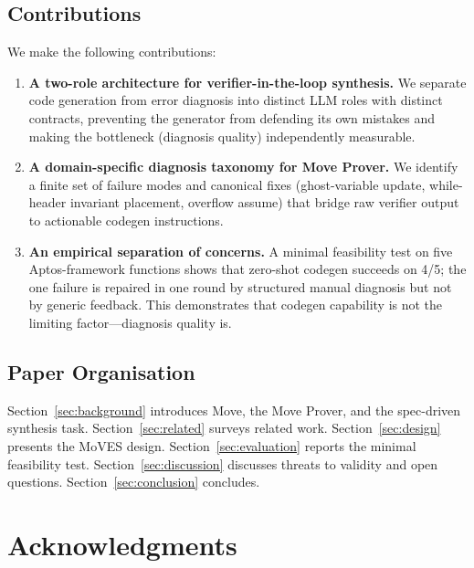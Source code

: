 \documentclass[conference]{IEEEtran}
\begin{document}
\subsection{Contributions}\label{sec:contributions}

We make the following contributions:

\begin{enumerate}
\item \textbf{A two-role architecture for verifier-in-the-loop synthesis.} We separate code generation from error diagnosis into distinct LLM roles with distinct contracts, preventing the generator from defending its own mistakes and making the bottleneck (diagnosis quality) independently measurable.
\item \textbf{A domain-specific diagnosis taxonomy for Move Prover.} We identify a finite set of failure modes and canonical fixes (ghost-variable update, while-header invariant placement, overflow assume) that bridge raw verifier output to actionable codegen instructions.
\item \textbf{An empirical separation of concerns.} A minimal feasibility test on five Aptos-framework functions shows that zero-shot codegen succeeds on 4/5; the one failure is repaired in one round by structured manual diagnosis but not by generic feedback. This demonstrates that codegen capability is not the limiting factor---diagnosis quality is.
\end{enumerate}

\subsection{Paper Organisation}\label{sec:organisation}

Section~\ref{sec:background} introduces Move, the Move Prover, and the spec-driven synthesis task. Section~\ref{sec:related} surveys related work. Section~\ref{sec:design} presents the MoVES design. Section~\ref{sec:evaluation} reports the minimal feasibility test. Section~\ref{sec:discussion} discusses threats to validity and open questions. Section~\ref{sec:conclusion} concludes.


\section*{Acknowledgments}




\end{document}
